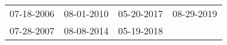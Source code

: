 \begin{supertabular}{llll}
 07-18-2006 &  08-01-2010 &  05-20-2017 &  08-29-2019 \\
 07-28-2007 &  08-08-2014 &  05-19-2018 &             \\
\end{supertabular}

